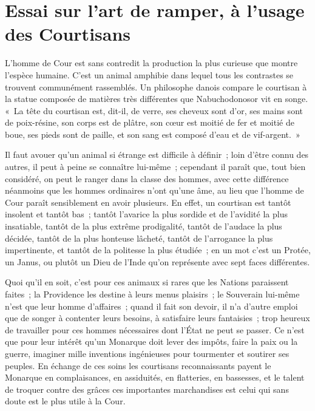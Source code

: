 \documentclass[french,twoside]{book} %
\begin{document}
  \chapter[{Essai sur l’art de ramper, à l’usage des Courtisans}]{Essai sur l’art de ramper, à l’usage des Courtisans}
\noindent L’homme de Cour est sans contredit la production la plus curieuse que montre l’espèce humaine. C’est un animal amphibie dans lequel tous les contrastes se trouvent communément rassemblés. Un philosophe danois compare le courtisan à la statue composée de matières très différentes que Nabuchodonosor vit en songe. « La tête du courtisan est, dit-il, de verre, ses cheveux sont d’or, ses mains sont de poix-résine, son corps est de plâtre, son cœur est moitié de fer et moitié de boue, ses pieds sont de paille, et son sang est composé d’eau et de vif-argent. »\par
Il faut avouer qu’un animal si étrange est difficile à définir ; loin d’être connu des autres, il peut à peine se connaître lui-même ; cependant il paraît que, tout bien considéré, on peut le ranger dans la classe des hommes, avec cette différence néanmoins que les hommes ordinaires n’ont qu’une âme, au lieu que l’homme de Cour paraît sensiblement en avoir plusieurs. En effet, un courtisan est tantôt insolent et tantôt bas ; tantôt l’avarice la plus sordide et de l’avidité la plus insatiable, tantôt de la plus extrême prodigalité, tantôt de l’audace la plus décidée, tantôt de la plus honteuse lâcheté, tantôt de l’arrogance la plus impertinente, et tantôt de la politesse la plus étudiée ; en un mot c’est un Protée, un Janus, ou plutôt un Dieu de l’Inde qu’on représente avec sept faces différentes.\par
Quoi qu’il en soit, c’est pour ces animaux si rares que les Nations paraissent faites ; la Providence les destine à leurs menus plaisirs ; le Souverain lui-même n’est que leur homme d’affaires ; quand il fait son devoir, il n’a d’autre emploi que de songer à contenter leurs besoins, à satisfaire leurs fantaisies ; trop heureux de travailler pour ces hommes nécessaires dont l’État ne peut se passer. Ce n’est que pour leur intérêt qu’un Monarque doit lever des impôts, faire la paix ou la guerre, imaginer mille inventions ingénieuses pour tourmenter et soutirer ses peuples. En échange de ces soins les courtisans reconnaissants payent le Monarque en complaisances, en assiduités, en flatteries, en bassesses, et le talent de troquer contre des grâces ces importantes marchandises est celui qui sans doute est le plus utile à la Cour.\par
\end{document}
